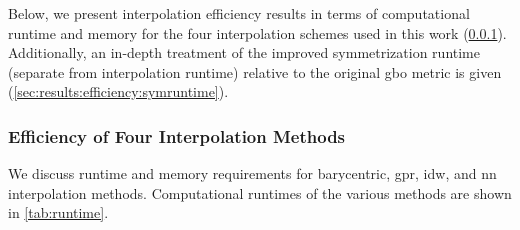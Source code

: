 \documentclass[final,twocolumn,12pt]{elsarticle}
\begin{document}
Below, we present interpolation efficiency results in terms of computational runtime and memory for the four interpolation schemes used in this work (\cref{sec:results:efficiency:methods}). Additionally, an in-depth treatment of the improved symmetrization runtime (separate from interpolation runtime) relative to the original \gls{gbo} metric is given (\cref{sec:results:efficiency:symruntime}).

\subsubsection{Efficiency of Four Interpolation Methods}
\label{sec:results:efficiency:methods}

We discuss runtime and memory requirements for barycentric, \gls{gpr}, \gls{idw}, and \gls{nn} interpolation methods. Computational runtimes of the various methods are shown in \cref{tab:runtime}.
\end{document}
